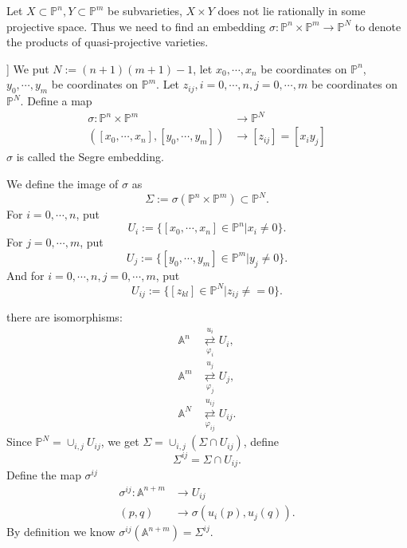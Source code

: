 \begin{remark}
	Let $ X\subset \mathbb{P}^n,Y\subset \mathbb{P}^m $ be subvarieties, $ X\times Y $ does not lie rationally in some projective space. Thus we need to find an embedding $ \sigma :\mathbb{P}^n\times \mathbb{P}^m \to \mathbb{P}^N$ to denote the products of quasi-projective varieties.
\end{remark}
\begin{definition}[[Segre Embedding]]
	We put $ N:=(n+1)(m+1)-1 $, let $ x_0,\cdots,x_n $ be coordinates on $ \mathbb{P}^n $, $ y_0,\cdots,y_m $ be coordinates on $ \mathbb{P}^m $. Let $ z_{ij}, i=0,\cdots,n, j=0,\cdots,m $ be coordinates on $ \mathbb{P}^N $. Define a map
	$$\begin{array}{cc}
			\sigma:\mathbb{P}^n\times \mathbb{P}^m & \to  \mathbb{P}^N      \\
			([x_0,\cdots,x_n],[y_0,\cdots,y_m])    & \to  [z_{ij}]=[x_iy_j]
		\end{array}$$
	$ \sigma $ is called the Segre embedding.
\end{definition}
\begin{definition}
	We define the image of $ \sigma $ as
	$$
		\Sigma := \sigma(\mathbb{P}^n\times \mathbb{P}^m)\subset \mathbb{P}^N.
	$$
	For $ i=0,\cdots,n $, put
	$$
		U_i:=\{ [x_0,\cdots,x_n]\in \mathbb{P}^n|x_i\neq 0 \}.
	$$
	For $ j=0,\cdots,m $, put
	$$
		U_j:=\{ [y_0,\cdots,y_m]\in\mathbb{P}^m|y_j\neq 0 \}.
	$$
	And for $ i=0,\cdots,n,j=0,\cdots,m $, put
	$$
		U_{ij}:=\{ [z_{kl}]\in \mathbb{P}^{N}|z_{ij}\neq =0 \}.
	$$
\end{definition}
there are isomorphisms:
\begin{align*}
	\mathbb{A}^n & \mathop{\rightleftarrows}\limits_{\varphi_i}^{u_i}  U_i   ,      \\
	\mathbb{A}^m & \mathop{\rightleftarrows}\limits_{\varphi_j}^{u_j} U_j       ,   \\
	\mathbb{A}^N & \mathop{\rightleftarrows}\limits_{\varphi_{ij}}^{u_{ij}} U_{ij}.
\end{align*}
Since $ \mathbb{P}^N=\mathop{\cup}_{i,j}U_{ij} $, we get $ \Sigma = \mathop{\cup}_{i,j}(\Sigma \cap U_{ij}) $, define
$$
	\Sigma^{ij}=\Sigma \cap U_{ij}.
$$
Define the map $ \sigma^{ij} $
$$\begin{array}{cc}
		\sigma^{ij}:\mathbb{A}^{n+m} & \to U_{ij}                  \\
		(p,q)                        & \to \sigma (u_i(p),u_j(q)).
	\end{array}$$
By definition we know $ \sigma^{ij}(\mathbb{A}^{n+m})=\Sigma^{ij} $.
